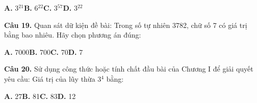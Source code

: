 \documentclass[11pt,a4paper]{article}
\begin{document}
\hspace*{1.5em}\textbf{A.} 3$^{21}$\quad\quad \textbf{B.} 6$^{22}$\quad\quad \textbf{C.} 3$^{57}$\quad\quad \textbf{D.} 3$^{22}$\par\vspace{2pt}
\textbf{\color{primary} Câu 19.} Quan sát dữ kiện đề bài: Trong số tự nhiên 3782, chữ số 7 có giá trị bằng bao nhiêu. Hãy chọn phương án đúng:\par
\hspace*{1.5em}\textbf{A.} 7000\quad\quad \textbf{B.} 700\quad\quad \textbf{C.} 70\quad\quad \textbf{D.} 7\par\vspace{2pt}
\textbf{\color{primary} Câu 20.} Sử dụng công thức hoặc tính chất đầu bài của Chương I để giải quyết yêu cầu: Giá trị của lũy thừa 3$^{4}$ bằng:\par
\hspace*{1.5em}\textbf{A.} 27\quad\quad \textbf{B.} 81\quad\quad \textbf{C.} 83\quad\quad \textbf{D.} 12\par\vspace{2pt}
\end{document}
